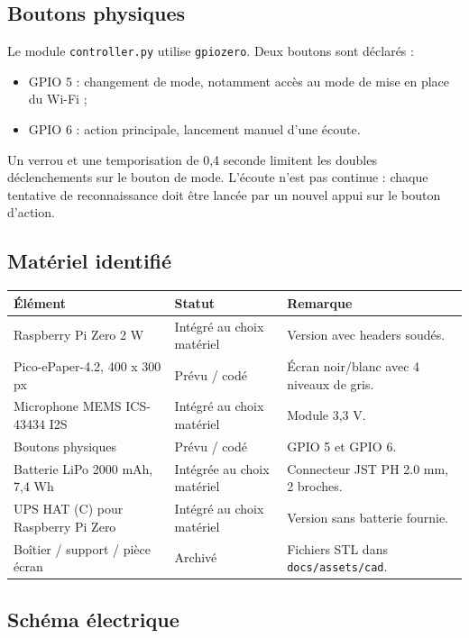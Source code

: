 \subsection{Boutons physiques}

Le module \texttt{controller.py} utilise \texttt{gpiozero}. Deux boutons sont
déclarés :

\begin{itemize}
    \item GPIO 5 : changement de mode, notamment accès au mode de mise en place du Wi-Fi ;
    \item GPIO 6 : action principale, lancement manuel d'une écoute.
\end{itemize}

Un verrou et une temporisation de 0,4 seconde limitent les doubles déclenchements
sur le bouton de mode. L'écoute n'est pas continue : chaque tentative de
reconnaissance doit être lancée par un nouvel appui sur le bouton d'action.

\subsection{Matériel identifié}

\begin{longtable}{|p{5cm}|p{4cm}|p{4cm}|}
\hline
\textbf{Élément} & \textbf{Statut} & \textbf{Remarque} \\
\hline
Raspberry Pi Zero 2 W & Intégré au choix matériel & Version avec headers soudés. \\
\hline
Pico-ePaper-4.2, 400 x 300 px & Prévu / codé & Écran noir/blanc avec 4 niveaux de gris. \\
\hline
Microphone MEMS ICS-43434 I2S & Intégré au choix matériel & Module 3,3 V. \\
\hline
Boutons physiques & Prévu / codé & GPIO 5 et GPIO 6. \\
\hline
Batterie LiPo 2000 mAh, 7,4 Wh & Intégrée au choix matériel & Connecteur JST PH 2.0 mm, 2 broches. \\
\hline
UPS HAT (C) pour Raspberry Pi Zero & Intégré au choix matériel & Version sans batterie fournie. \\
\hline
Boîtier / support / pièce écran & Archivé & Fichiers STL dans \texttt{docs/assets/cad}. \\
\hline
\end{longtable}

\subsection{Schéma électrique}

